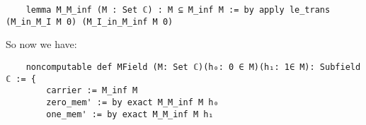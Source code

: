 \begin{lstlisting}
    lemma M_M_inf (M : Set ℂ) : M ⊆ M_inf M := by apply le_trans (M_in_M_I M 0) (M_I_in_M_inf M 0)
\end{lstlisting}

So now we have:
\begin{lstlisting}
    noncomputable def MField (M: Set ℂ)(h₀: 0 ∈ M)(h₁: 1∈ M): Subfield ℂ := {
        carrier := M_inf M
        zero_mem' := by exact M_M_inf M h₀
        one_mem' := by exact M_M_inf M h₁
\end{lstlisting}